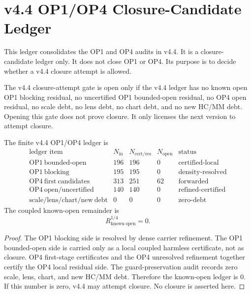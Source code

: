 
\section{v4.4 OP1/OP4 Closure-Candidate Ledger}
\label{sec:v44-op1-op4-closure-candidate-ledger}

This ledger consolidates the OP1 and OP4 audits in v4.4.  It is a
closure-candidate ledger only.  It does not close OP1 or OP4.  Its purpose is
to decide whether a v4.4 closure attempt is allowed.

\begin{definition}
The v4.4 closure-attempt gate is open only if the v4.4 ledger has no known
open OP1 blocking residual, no uncertified OP1 bounded-open residual, no OP4
open residual, no scale debt, no lens debt, no chart debt, and no new HC/MM
debt.  Opening this gate does not prove closure.  It only licenses the next
version to attempt closure.
\end{definition}

\begin{proposition}
The finite v4.4 OP1/OP4 ledger is
\[
\begin{array}{c|r|r|r|c}
\text{ledger item} & N_{\mathrm{in}} & N_{\mathrm{cert/res}} &
N_{\mathrm{open}} & \text{status}\\
\hline
\mathrm{OP1\ bounded\text{-}open} & 196 & 196 & 0 & \mathrm{certified\text{-}local}\\
\mathrm{OP1\ blocking} & 195 & 195 & 0 & \mathrm{density\text{-}resolved}\\
\mathrm{OP4\ first\ candidates} & 313 & 251 & 62 & \mathrm{forwarded}\\
\mathrm{OP4\ open/uncertified} & 140 & 140 & 0 & \mathrm{refined\text{-}certified}\\
\mathrm{scale/lens/chart/new\ debt} & 0 & 0 & 0 & \mathrm{zero\text{-}debt}
\end{array}
\]
The coupled known-open remainder is
\[
    R_{\mathrm{known\ open}}^{1/4}=0.
\]
\end{proposition}

\begin{proof}
The OP1 blocking side is resolved by dense carrier refinement.  The OP1
bounded-open side is carried only as a local coupled harmless certificate, not
as closure.  OP4 first-stage certificates and the OP4 unresolved refinement
together certify the OP4 local residual side.  The guard-preservation audit
records zero scale, lens, chart, and new HC/MM debt.  Therefore the known-open
ledger is \(0\).  If this number is zero, v4.4 may attempt closure.
No closure is asserted here.
\end{proof}

